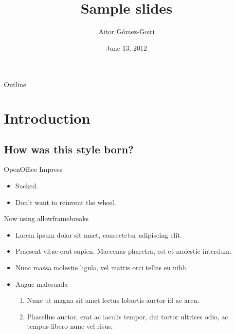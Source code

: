\documentclass{beamer} %
\title{Sample slides}
\author{Aitor Gómez-Goiri}
\institute{DeustoTech - Deusto Institute of Technology, University of Deusto
\url{http://www.morelab.deusto.es}}
\date{June 13, 2012}
\begin{document}
  \setSubjectColor[green]
  \owntitlepage

  \begin{frame}{Outline}
    \transwipe
  \end{frame}

\section{Introduction}
  \subsection{How was this style born?}
  \begin{frame}{OpenOffice Impress}
    \begin{itemize}
	\item Sucked.
	\pause
	\item Don't want to reinvent the wheel.
    \end{itemize}
  \end{frame}

  \begin{frame}[allowframebreaks]{Now using allowframebreaks}
    \begin{itemize}
      \item Lorem ipsum dolor sit amet, consectetur adipiscing elit.
      \item Praesent vitae erat sapien. Maecenas pharetra, est et molestie interdum.
      \item Nunc massa molestie ligula, vel mattis orci tellus eu nibh.
      \framebreak
      \item Augue malesuada
      \begin{enumerate}
	  \item Nunc ut magna sit amet lectus lobortis auctor id ac arcu.
	  \item Phasellus auctor, erat ac iaculis tempor, dui tortor ultrices odio, ac tempus libero nunc vel risus.
	\end{enumerate}
    \end{itemize}
  \end{frame}

\end{document}
